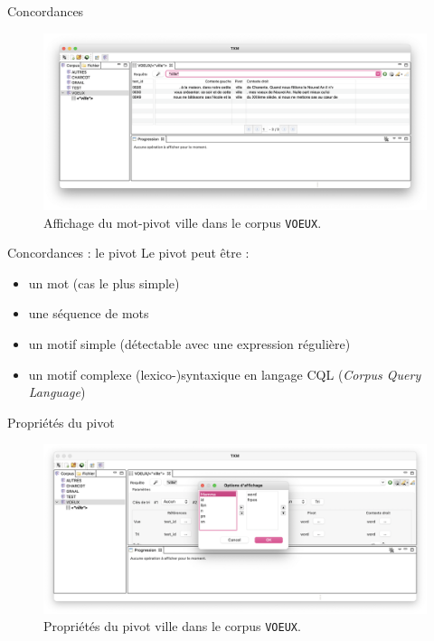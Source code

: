 \documentclass[xetex,xcolor={table,usenames,dvipsnames}]{beamer}
\begin{document}
\begin{frame}{Concordances}
		\begin{figure}[h] %
		\centering
		\includegraphics[width=1\linewidth]{img/ville.png}
		\caption{Affichage du mot-pivot \og{}ville\fg{} dans le corpus \texttt{VOEUX}.}
		\label{fig:ling_out_TAL}
	\end{figure}
\end{frame}

\begin{frame}{Concordances : le pivot}
Le pivot peut être :
\begin{itemize}
	\item un mot (cas le plus simple)
	\item une séquence de mots
	\item un motif simple (détectable avec une expression régulière)
	\item un motif complexe (lexico-)syntaxique en langage \textsc{CQL} (\textit{Corpus Query Language})
\end{itemize}

\end{frame}

\begin{frame}{Propriétés du pivot}
			\begin{figure}[h] %
		\centering
		\includegraphics[width=1\linewidth]{img/propriete_pivot.png}
		\caption{Propriétés du pivot \og{}ville\fg{} dans le corpus \texttt{VOEUX}.}
		\label{fig:ling_out_TAL}
	\end{figure}
\end{frame}
\end{document}
